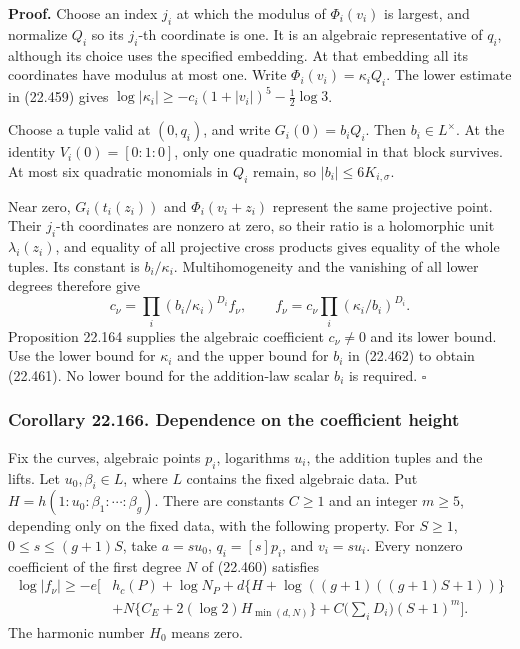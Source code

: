 \documentclass[
  11pt,
  a4paper,
]{article}
\begin{document}
\textbf{Proof.} Choose an index \(j_i\) at which the modulus of
\(\Phi_i(v_i)\) is largest, and normalize \(Q_i\) so its \(j_i\)-th
coordinate is one. It is an algebraic representative of \(q_i\),
although its choice uses the specified embedding. At that embedding all
its coordinates have modulus at most one. Write
\(\Phi_i(v_i)=\kappa_iQ_i\). The lower estimate in (22.459) gives
\(\log|\kappa_i|\ge-c_i(1+|v_i|)^5-\tfrac12\log3\).

Choose a tuple valid at \((0,q_i)\), and write \(G_i(0)=b_iQ_i\). Then
\(b_i\in L^\times\). At the identity \(V_i(0)=[0:1:0]\), only one
quadratic monomial in that block survives. At most six quadratic
monomials in \(Q_i\) remain, so \(|b_i|\le6K_{i,\sigma}\).

Near zero, \(G_i(t_i(z_i))\) and \(\Phi_i(v_i+z_i)\) represent the same
projective point. Their \(j_i\)-th coordinates are nonzero at zero, so
their ratio is a holomorphic unit \(\lambda_i(z_i)\), and equality of
all projective cross products gives equality of the whole tuples. Its
constant is \(b_i/\kappa_i\). Multihomogeneity and the vanishing of all
lower degrees therefore give \[
 c_\nu=\prod_i(b_i/\kappa_i)^{D_i}f_\nu,
 \qquad
 f_\nu=c_\nu\prod_i(\kappa_i/b_i)^{D_i}.
 \tag{22.462}
\] Proposition 22.164 supplies the algebraic coefficient \(c_\nu\ne0\)
and its lower bound. Use the lower bound for \(\kappa_i\) and the upper
bound for \(b_i\) in (22.462) to obtain (22.461). No lower bound for the
addition-law scalar \(b_i\) is required. \(\square\)

\subsubsection{Corollary 22.166. Dependence on the coefficient
height}\label{corollary-22.166.-dependence-on-the-coefficient-height}

Fix the curves, algebraic points \(p_i\), logarithms \(u_i\), the
addition tuples and the lifts. Let \(u_0,\beta_i\in L\), where \(L\)
contains the fixed algebraic data. Put
\(H=h(1:u_0:\beta_1:\cdots:\beta_g)\). There are constants \(C\ge1\) and
an integer \(m\ge5\), depending only on the fixed data, with the
following property. For \(S\ge1\), \(0\le s\le(g+1)S\), take \(a=su_0\),
\(q_i=[s]p_i\), and \(v_i=su_i\). Every nonzero coefficient of the first
degree \(N\) of (22.460) satisfies \[
\begin{split}
 \log|f_\nu|\ge-e\bigg[&h_c(P)+\log N_P
 +d\{H+\log((g+1)((g+1)S+1))\}\\
 &+N\{C_E+2(\log2)H_{\min(d,N)}\}
 +C\Big(\sum_iD_i\Big)(S+1)^m\bigg].
\end{split}
\tag{22.463}
\] The harmonic number \(H_0\) means zero.
\end{document}

